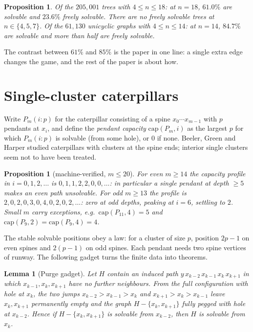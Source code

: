 \documentclass[11pt]{article}
\newtheorem{lemma}[theorem]{Lemma}
\newtheorem{proposition}[theorem]{Proposition}
\theoremstyle{definition}
\newcommand{\cp}{\mathrm{cap}}
\begin{document}
\begin{proposition}\label{prop:atlas}
Of the $205{,}001$ trees with $4\le n\le 18$: at $n=18$, $61.0\%$
are solvable and $23.6\%$ freely solvable. There are no freely
solvable trees at $n\in\{4,5,7\}$. Of the $61{,}130$ unicyclic
graphs with $4\le n\le 14$: at $n=14$, $84.7\%$ are solvable and
more than half are freely solvable.
\end{proposition}

The contrast between $61\%$ and $85\%$ is the paper in one line: a
single extra edge changes the game, and the rest of the paper is
about how.

\section{Single-cluster caterpillars}\label{sec:caterpillar}

Write $P_m(i\!:\!p)$ for the caterpillar consisting of a spine
$x_0\cdots x_{m-1}$ with $p$ pendants at $x_i$, and define the
\emph{pendant capacity} $\cp(P_m,i)$ as the largest $p$ for which
$P_m(i\!:\!p)$ is solvable (from some hole), or $0$ if none.
Beeler, Green and Harper \cite{BGH17} studied caterpillars with
clusters at the spine ends; interior single clusters seem not to have
been treated.

\begin{proposition}[machine-verified, $m\le 20$]\label{prop:cap}
For even $m\ge 14$ the capacity profile in $i=0,1,2,\dots$ is
$0,1,1,2,2,0,0,\dots$: in particular a single pendant at depth
$\ge 5$ makes an even path unsolvable. For odd $m\ge 13$ the profile
is $2,0,2,0,3,0,4,0,2,0,2,\dots$: zero at odd depths, peaking at
$i=6$, settling to $2$. Small $m$ carry exceptions, e.g.\
$\cp(P_{11},4)=5$ and $\cp(P_9,2)=\cp(P_9,4)=4$.
\end{proposition}

The stable solvable positions obey a law: for a cluster of size $p$,
position $2p-1$ on even spines and $2(p-1)$ on odd spines. Each
pendant needs two spine vertices of runway. The following gadget
turns the finite data into theorems.

\begin{lemma}[Purge gadget]\label{lem:purge}
Let $H$ contain an induced path $y\,x_{k-2}\,x_{k-1}\,x_k\,x_{k+1}$
in which $x_{k-1},x_k,x_{k+1}$ have no further neighbours. From the
full configuration with hole at $x_k$, the two jumps
$x_{k-2}\!>\!x_{k-1}\!>\!x_k$ and $x_{k+1}\!>\!x_k\!>\!x_{k-1}$
leave $x_k,x_{k+1}$ permanently empty and the graph
$H-\{x_k,x_{k+1}\}$ fully pegged with hole at $x_{k-2}$. Hence if
$H-\{x_k,x_{k+1}\}$ is solvable from $x_{k-2}$, then $H$ is solvable
from $x_k$.
\end{lemma}
\end{document}
